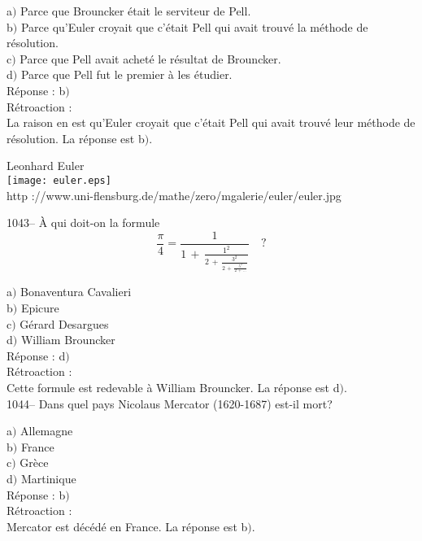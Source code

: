 ﻿\documentclass[letterpaper, 12pt]{article}
\begin{document}
a$)$ Parce que Brouncker \'etait le serviteur de Pell. \\
b$)$ Parce qu'Euler croyait que c'\'etait Pell qui avait trouv\'e la
m\'ethode de r\'esolution.  \\
c$)$ Parce que Pell avait achet\'e le r\'esultat de Brouncker.  \\
d$)$ Parce que Pell fut le premier \`a les \'etudier.\\

R\'eponse : b$)$\\

R\'etroaction : \\
La raison en est qu'Euler croyait que c'\'etait Pell qui avait
trouv\'e leur m\'ethode de r\'esolution.
La r\'eponse est b$)$.\\
        \begin{center}
        Leonhard Euler\\
    \texttt{[image: euler.eps]}\\
        {\footnotesize http
://www.uni-flensburg.de/mathe/zero/mgalerie/euler/euler.jpg}
    \end{center}

1043-- \`A qui doit-on la formule
$$\displaystyle{\frac{\pi}4=\frac1{1\,+\,\frac{1^2}{2\,+\,\frac{3^2}{2\,+\,\frac{5^2}{2\,+\,\ldots}}}}}\quad?$$

a$)$ Bonaventura Cavalieri \\
b$)$ Epicure \\
c$)$ G\'erard Desargues  \\
d$)$ William Brouncker\\

R\'eponse : d$)$\\

R\'etroaction : \\
Cette formule est redevable \`a William Brouncker.
La r\'eponse est d$)$.\\

1044-- Dans quel pays Nicolaus Mercator (1620-1687) est-il mort?

a$)$ Allemagne \\
b$)$ France  \\
c$)$ Gr\`ece  \\
d$)$ Martinique \\

R\'eponse : b$)$\\

R\'etroaction : \\
Mercator est d\'ec\'ed\'e en France.
La r\'eponse est b$)$.\\
\end{document}
